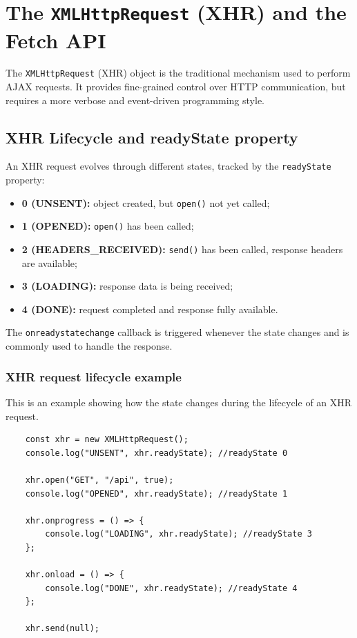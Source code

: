 \documentclass{scrbook}
\begin{document}
	\section{The \texttt{XMLHttpRequest} (XHR) and the Fetch API}
	
	The \texttt{XMLHttpRequest} (XHR) object is the traditional mechanism used to perform AJAX requests. It provides fine-grained control over HTTP communication, but requires a more verbose and event-driven programming style.
	
	\subsection{XHR Lifecycle and readyState property}
	
	An XHR request evolves through different states, tracked by the \texttt{readyState} property:
	
	\begin{itemize}
		\item \textbf{0 (UNSENT):} object created, but \texttt{open()} not yet called;
		
		\item \textbf{1 (OPENED):} \texttt{open()} has been called;
		
		\item \textbf{2 (HEADERS\_RECEIVED):} \texttt{send()} has been called, response headers are available;
		
		\item \textbf{3 (LOADING):} response data is being received;
		
		\item \textbf{4 (DONE):} request completed and response fully available.
	\end{itemize}
	
	The \texttt{onreadystatechange} callback is triggered whenever the state changes and is commonly used to handle the response.\\
	
	\subsubsection{XHR request lifecycle example}
	
	This is an example showing how the state changes during the lifecycle of an XHR request.
	
	\begin{lstlisting}
	const xhr = new XMLHttpRequest();
	console.log("UNSENT", xhr.readyState); //readyState 0
	
	xhr.open("GET", "/api", true);
	console.log("OPENED", xhr.readyState); //readyState 1
	
	xhr.onprogress = () => {
		console.log("LOADING", xhr.readyState); //readyState 3
	};
	
	xhr.onload = () => {
		console.log("DONE", xhr.readyState); //readyState 4
	};
	
	xhr.send(null);
	\end{lstlisting}
	
\end{document}
